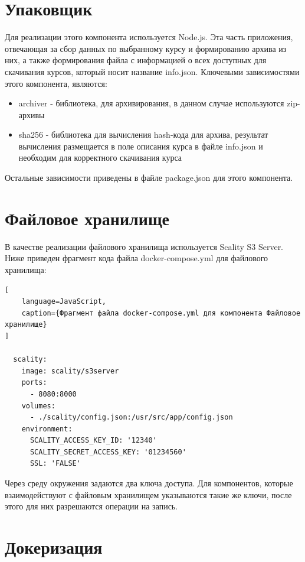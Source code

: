 \documentclass[%
  a5paper,
  subf,
  href,
  master,
  dotsinheaders 
]{csse-fcs}
\begin{document}
\section{Упаковщик}

Для реализации этого компонента используется Node.js. Эта часть приложения, отвечающая за сбор данных по выбранному курсу и формированию архива из них, а также формирования файла с информацией о всех доступных для скачивания курсов, который носит название info.json.
Ключевыми зависимостями этого компонента, являются:

\begin{itemize}
	\item archiver - библиотека, для архивирования, в данном случае используются zip-архивы
	\item sha256 - библиотека для вычисления hash-кода для архива, результат вычисления размещается в поле описания курса в файле info.json и необходим для корректного скачивания курса
\end{itemize}

Остальные зависимости приведены в файле package.json для этого компонента.

\section{Файловое хранилище}

В качестве реализации файлового хранилища используется Scality S3 Server.
Ниже приведен фрагмент кода файла docker-compose.yml для файлового хранилища:


\begin{lstlisting}[
    language=JavaScript,
    caption={Фрагмент файла docker-compose.yml для компонента Файловое хранилище}
]

  scality:
    image: scality/s3server
    ports:
      - 8080:8000
    volumes:
      - ./scality/config.json:/usr/src/app/config.json
    environment:
      SCALITY_ACCESS_KEY_ID: '12340'
      SCALITY_SECRET_ACCESS_KEY: '01234560'
      SSL: 'FALSE'

\end{lstlisting}

Через среду окружения задаются два ключа доступа. Для компонентов, которые взаимодействуют с файловым хранилищем указываются такие же ключи, после этого для них разрешаются операции на запись.

\section{Докеризация}
\end{document}
